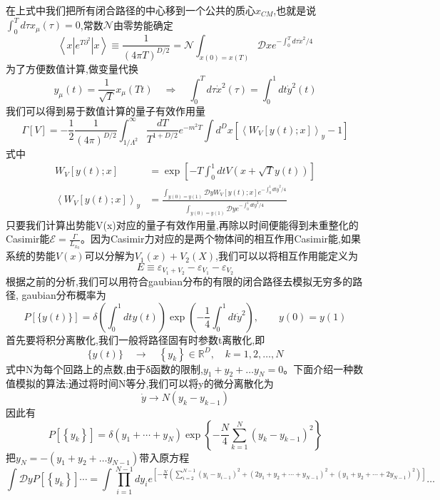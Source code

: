 在上式中我们把所有闭合路径的中心移到一个公共的质心$x_{CM}$,也就是说$\int_{0}^{T} d \tau x_{\mu}(\tau)=0$,常数$\mathcal{N}$由零势能确定
$$
\left\langle x\left|e^{T \partial^{2}}\right| x\right\rangle \equiv \frac{1}{(4 \pi T)^{D / 2}}=\mathcal{N} \int_{x(0)=x(T)} \mathcal{D} x e^{-\int_{0}^{T} d \tau \dot{x}^{2} / 4}
$$
为了方便数值计算,做变量代换
$$
y_{\mu}(t)=\frac{1}{\sqrt{T}} x_{\mu}(T t) \quad \Longrightarrow \quad \int_{0}^{T} d \tau \dot{x}^{2}(\tau)=\int_{0}^{1} d t \dot{y}^{2}(t)
$$
我们可以得到易于数值计算的量子有效作用量
$$
\Gamma[V]=-\frac{1}{2} \frac{1}{(4 \pi)^{D / 2}} \int_{1 / \Lambda^{2}}^{\infty} \frac{d T}{T^{1+D / 2}} e^{-m^{2} T} \int d^{D} x\left[\left\langle W_{V}[y(t) ; x]\right\rangle_{y}-1\right]
$$
式中
\begin{equation*}
\begin{split}
W_{V}[y(t) ; x]&=\exp \left[-T \int_{0}^{1} d t V(x+\sqrt{T} y(t))\right] \\
\left\langle W_{V}[y(t) ; x]\right\rangle_{y}&=\frac{\int_{y(0)=y(1)} \mathcal{D} y W_{V}[y(t) ; x] e^{-\int_{0}^{1} d t \dot{y}^{2} / 4}}{\int_{y(0)=y(1)} \mathcal{D} y e^{-\int_{0}^{1} d t \dot{y}^{2} / 4}}
\end{split}
\end{equation*}
只要我们计算出势能V(x)对应的量子有效作用量,再除以时间便能得到未重整化的Casimir能$\mathcal{E}=\frac{\Gamma}{L_{x_{0}}}$。因为Casimir力对应的是两个物体间的相互作用Casimir能,如果系统的势能$V(x)$可以分解为$V_1(x)+V_2(X)$,我们可以以将相互作用能定义为
$$
{E} \equiv \varepsilon_{{V}_{1}+{V}_{2}}-\varepsilon_{{V}_{1}}-\varepsilon_{{V}_{2}}
$$
根据之前的分析,我们可以用符合gaubian分布的有限的闭合路径去模拟无穷多的路径\cite{Gies_2001}, gaubian分布概率为
$$
P[\{y(t)\}]=\delta\left(\int_{0}^{1} d t y(t)\right) \exp \left(-\frac{1}{4} \int_{0}^{1} d t \dot{y}^{2}\right),\quad  \quad y(0)=y(1)
$$
首先要将积分离散化,我们一般将路径固有时参数t离散化,即
$$
\{y(t)\} \quad \rightarrow \quad\left\{y_{k}\right\} \in \mathbb{R}^{D},\quad k=1,2,\ldots,N
$$
式中N为每个回路上的点数,由于δ函数的限制,$y_1+ y_2+…y_N=0$。下面介绍一种数值模拟的算法:通过将时间N等分,我们可以将y的微分离散化为
$$
\dot{y} \rightarrow N\left(y_{k}-y_{k-1}\right)
$$
因此有
$$
P\left[\left\{y_{k}\right\}\right]=\delta\left(y_{1}+\cdots+y_{N}\right) \exp \left\{-\frac{N}{4} \sum_{k=1}^{N}\left(y_{k}-y_{k-1}\right)^{2}\right\}
$$
把$y_N=-(y_1+ y_2+…y_{N-1})$带入原方程
$$
\int \mathcal{D} y P\left[\left\{y_{k}\right\}\right] \cdots=\int \prod_{i=1}^{N-1} d y_{i} e^{\left[-\frac{N}{4}\left(\sum_{i=2}^{N-1}\left(y_{i}-y_{i-1}\right)^{2}+\left(2 y_{1}+y_{2}+\cdots+y_{N-1}\right)^{2}+\left(y_{1}+y_{2}+\cdots+2 y_{N-1}\right)^{2}\right)\right]} \ldots
$$
